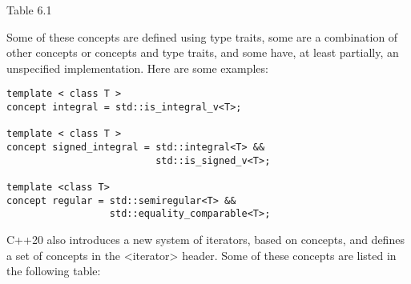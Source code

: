 \begin{center}
Table 6.1
\end{center}

Some of these concepts are defined using type traits, some are a combination of other concepts or concepts and type traits, and some have, at least partially, an unspecified implementation. Here are some examples:

\begin{lstlisting}[style=styleCXX]
template < class T >
concept integral = std::is_integral_v<T>;

template < class T >
concept signed_integral = std::integral<T> &&
                          std::is_signed_v<T>;

template <class T>
concept regular = std::semiregular<T> &&
                  std::equality_comparable<T>;
\end{lstlisting}

C++20 also introduces a new system of iterators, based on concepts, and defines a set of concepts in the <iterator> header. Some of these concepts are listed in the following table:

